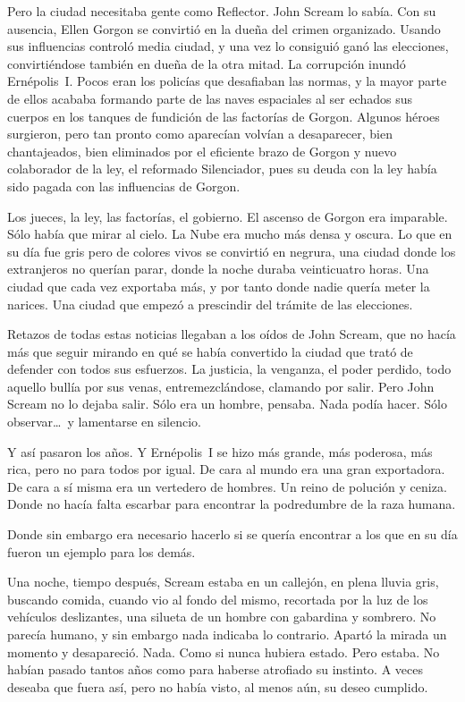Pero la ciudad necesitaba gente como Reflector. John Scream lo sabía. Con su ausencia, Ellen Gorgon se convirtió en la dueña del crimen organizado. Usando sus influencias controló media ciudad, y una vez lo consiguió ganó las elecciones, convirtiéndose también en dueña de la otra mitad. La corrupción inundó Ernépolis~I. Pocos eran los policías que desafiaban las normas, y la mayor parte de ellos acababa formando parte de las naves espaciales al ser echados sus cuerpos en los tanques de fundición de las factorías de Gorgon. Algunos héroes surgieron, pero tan pronto como aparecían volvían a desaparecer, bien chantajeados, bien eliminados por el eficiente brazo de Gorgon y nuevo colaborador de la ley, el reformado Silenciador, pues su deuda con la ley había sido pagada con las influencias de Gorgon.

Los jueces, la ley, las factorías, el gobierno. El ascenso de Gorgon era imparable. Sólo había que mirar al cielo. La Nube era mucho más densa y oscura. Lo que en su día fue gris pero de colores vivos se convirtió en negrura, una ciudad donde los extranjeros no querían parar, donde la noche duraba veinticuatro horas. Una ciudad que cada vez exportaba más, y por tanto donde nadie quería meter la narices. Una ciudad que empezó a prescindir del trámite de las elecciones.

Retazos de todas estas noticias llegaban a los oídos de John Scream, que no hacía más que seguir mirando en qué se había convertido la ciudad que trató de defender con todos sus esfuerzos. La justicia, la venganza, el poder perdido, todo aquello bullía por sus venas, entremezclándose, clamando por salir. Pero John Scream no lo dejaba salir. Sólo era un hombre, pensaba. Nada podía hacer. Sólo observar\dots\ y lamentarse en silencio.

Y así pasaron los años. Y Ernépolis~I se hizo más grande, más poderosa, más rica, pero no para todos por igual. De cara al mundo era una gran exportadora. De cara a sí misma era un vertedero de hombres. Un reino de polución y ceniza. Donde no hacía falta escarbar para encontrar la podredumbre de la raza humana.

Donde sin embargo era necesario hacerlo si se quería encontrar a los que en su día fueron un ejemplo para los demás.

\parbreak
Una noche, tiempo después, Scream estaba en un callejón, en plena lluvia gris, buscando comida, cuando vio al fondo del mismo, recortada por la luz de los vehículos deslizantes, una silueta de un hombre con gabardina y sombrero. No parecía humano, y sin embargo nada indicaba lo contrario. Apartó la mirada un momento y desapareció. Nada. Como si nunca hubiera estado. Pero estaba. No habían pasado tantos años como para haberse atrofiado su instinto. A veces deseaba que fuera así, pero no había visto, al menos aún, su deseo cumplido.

